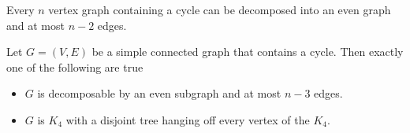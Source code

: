 \documentclass[10pt,a4paper]{amsart}
\begin{document}
\begin{theorem}\label{Thm: Eulerian decomp}
    Every $n$ vertex graph containing a cycle can be decomposed into an even graph and at most $n-2$ edges.
\end{theorem}

\begin{theorem}\label{Thm: n-3 even}
Let $G = (V,E)$ be a simple connected graph that contains a cycle. Then exactly one of the following are true
\begin{itemize}
\item[i)] $G$ is decomposable by an even subgraph and at most $n-3$ edges.
\item[ii)] $G$ is $K_4$ with a disjoint tree hanging off every vertex of the $K_4$.
\end{itemize}
\end{theorem}
\end{document}
